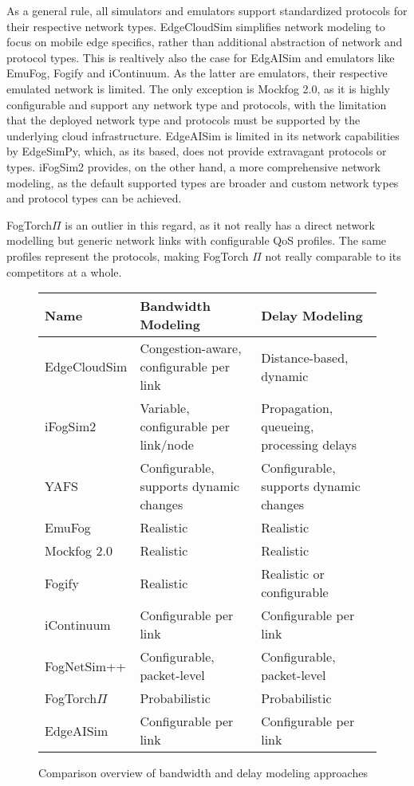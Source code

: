 As a general rule, all simulators and emulators support standardized protocols for their respective network types.
EdgeCloudSim simplifies network modeling to focus on mobile edge specifics, rather than additional abstraction of network and protocol types.
This is realtively also the case for EdgAISim and emulators like EmuFog, Fogify and iContinuum.
As the latter are emulators, their respective emulated network is limited.
The only exception is Mockfog 2.0, as it is highly configurable and support any network type and protocols, with the limitation that the deployed network type and protocols must be supported by the underlying cloud infrastructure.
EdgeAISim is limited in its network capabilities by EdgeSimPy, which, as its based, does not provide extravagant protocols or types.
iFogSim2 provides, on the other hand, a more comprehensive network modeling, as the default supported types are broader and custom network types and protocol types can be achieved.

FogTorch$\Pi$ is an outlier in this regard, as it not really has a direct network modelling but generic network links with configurable QoS profiles.
The same profiles represent the protocols, making FogTorch $\Pi$ not really comparable to its competitors at a whole.

\begin{figure}[H]
  \centering
  \begin{tabularx}{\textwidth}{l | X | X }
    \hline
    \textbf{Name} & \textbf{Bandwidth Modeling} & \textbf{Delay Modeling} \\
    \hline\hline
    EdgeCloudSim  & Congestion-aware, configurable per link & Distance-based, dynamic\\\hline
    iFogSim2      & Variable, configurable per link/node    & Propagation, queueing, processing delays\\\hline
    YAFS          & Configurable, supports dynamic changes  & Configurable, supports dynamic changes\\\hline
    EmuFog        & Realistic                               & Realistic\\\hline
    Mockfog 2.0   & Realistic                               & Realistic\\\hline
    Fogify        & Realistic                               & Realistic or configurable \\\hline
    iContinuum    & Configurable per link                   & Configurable per link \\\hline
    FogNetSim++   & Configurable, packet-level              & Configurable, packet-level\\\hline
    FogTorch$\Pi$ & Probabilistic                           & Probabilistic\\\hline
    EdgeAISim     & Configurable per link                   & Configurable per link\\\hline
  \end{tabularx}
  \caption{Comparison overview of bandwidth and delay modeling approaches}
  \label{tab:analysis-network-characteristics}
\end{figure}

